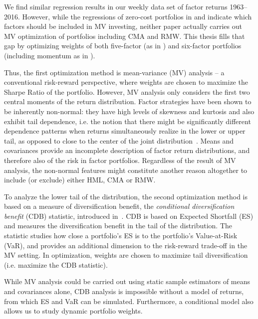 We find similar regression results in our weekly data set of factor returns 1963--2016. However, while the regressions of zero-cost portfolios in \textcite{FF2015} and \textcite{Asness2015} indicate which factors should be included in MV investing, neither paper actually carries out MV optimization of portfolios including CMA and RMW. This thesis fills that gap by optimizing weights of both five-factor (as in \textcite{FF2015}) and six-factor portfolios (including momentum as in \textcite{Asness2015}). 

Thus, the first optimization method is mean-variance (MV) analysis -- a conventional risk-reward perspective, where weights are chosen to maximize the Sharpe Ratio of the portfolio. However, MV analysis only considers the first two central moments of the return distribution. Factor strategies have been shown to be inherently non-normal: they have high levels of skewness and kurtosis and also exhibit tail dependence, i.e. the notion that there might be significantly different dependence patterns when returns simultaneously realize in the lower or upper tail, as opposed to close to the center of the joint distribution~\autocite{ChristoffersenLanglois2013}. Means and covariances provide an incomplete description of factor return distributions, and therefore also of the risk in factor portfolios. Regardless of the result of MV analysis, the non-normal features might constitute another reason altogether to include (or exclude) either HML, CMA or RMW.

To analyze the lower tail of the distribution, the second optimization method is based on a measure of diversification benefit, the \emph{conditional diversification benefit} (CDB) statistic, introduced in~\textcite{ChristoffersenErrunzaJacobLanglois2012}. CDB is based on Expected Shortfall (ES) and measures the diversification benefit in the tail of the distribution. The statistic studies how close a portfolio's ES is to the portfolio's Value-at-Risk (VaR), and provides an additional dimension to the risk-reward trade-off in the MV setting. In optimization, weights are chosen to maximize tail diversification (i.e. maximize the CDB statistic).

While MV analysis could be carried out using static sample estimators of means and covariances alone, CDB analysis is impossible without a model of returns, from which ES and VaR can be simulated. Furthermore, a conditional model also allows us to study dynamic portfolio weights. 


